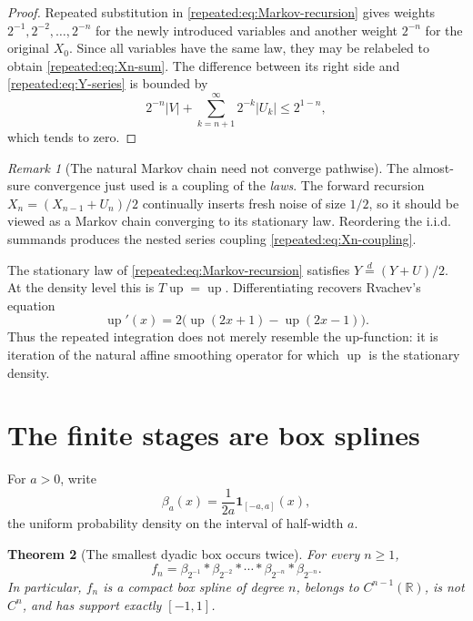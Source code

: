 \documentclass[11pt,oneside]{article}
\newtheorem{theorem}{Theorem}[section]
\theoremstyle{definition}
\theoremstyle{remark}
\newtheorem{remark}[theorem]{Remark}
\newcommand{\R}{\mathbb R}
\newcommand{\Up}{\operatorname{up}}
\begin{document}
\begin{proof}
Repeated substitution in \eqref{repeated:eq:Markov-recursion} gives weights
$2^{-1},2^{-2},\ldots,2^{-n}$ for the newly introduced variables and another weight $2^{-n}$
for the original $X_0$.  Since all variables have the same law, they may be relabeled to obtain
\eqref{repeated:eq:Xn-sum}.  The difference between its right side and \eqref{repeated:eq:Y-series} is bounded by
\[
 2^{-n}|V|+\sum_{k=n+1}^{\infty}2^{-k}|U_k|\le2^{1-n},
\]
which tends to zero.
\end{proof}

\begin{remark}[The natural Markov chain need not converge pathwise]
The almost-sure convergence just used is a coupling of the \emph{laws}.  The forward recursion
$X_n=(X_{n-1}+U_n)/2$ continually inserts fresh noise of size $1/2$, so it should be viewed as
a Markov chain converging to its stationary law.  Reordering the i.i.d. summands produces the
nested series coupling \eqref{repeated:eq:Xn-coupling}.
\end{remark}

The stationary law of \eqref{repeated:eq:Markov-recursion} satisfies
$Y\overset d=(Y+U)/2$.  At the density level this is $T\Up=\Up$.  Differentiating recovers
Rvachev's equation
\begin{equation}
 \Up'(x)=2\bigl(\Up(2x+1)-\Up(2x-1)\bigr).                \label{repeated:eq:up-diffeq}
\end{equation}
Thus the repeated integration does not merely resemble the up-function: it is iteration of
the natural affine smoothing operator for which $\Up$ is the stationary density.

\section{The finite stages are box splines}
\label{repeated:sec:box-splines}

For $a>0$, write
\begin{equation}
 \beta_a(x)=\frac1{2a}\mathbf 1_{[-a,a]}(x),               \label{repeated:eq:beta}
\end{equation}
the uniform probability density on the interval of half-width $a$.

\begin{theorem}[The smallest dyadic box occurs twice]
\label{repeated:thm:box-convolution}
For every $n\ge1$,
\begin{equation}
 \boxed{\displaystyle
 f_n=\beta_{2^{-1}}*\beta_{2^{-2}}*\cdots*\beta_{2^{-n}}*\beta_{2^{-n}}.}
                                                                    \label{repeated:eq:fn-box}
\end{equation}
In particular, $f_n$ is a compact box spline of degree $n$, belongs to $C^{n-1}(\R)$, is not
$C^n$, and has support exactly $[-1,1]$.
\end{theorem}
\end{document}
